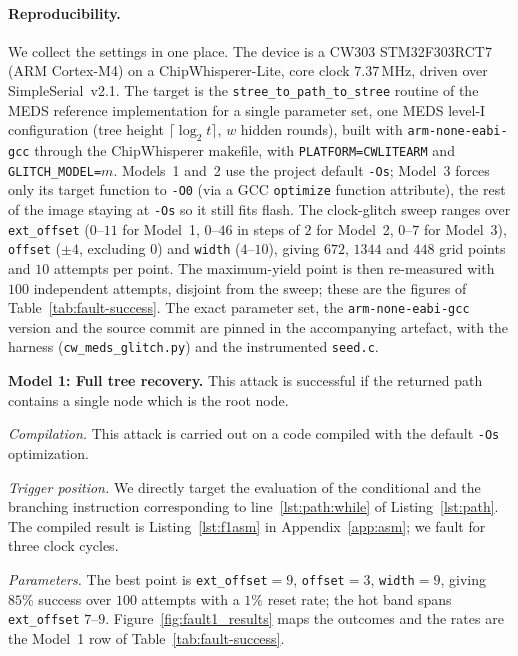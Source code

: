\paragraph{Reproducibility.} We collect the settings in one place. The
device is a CW303 STM32F303RCT7 (ARM Cortex-M4) on a ChipWhisperer-Lite, core
clock $7.37$\,MHz, driven over SimpleSerial~v2.1. The target is the
\texttt{stree\_to\_path\_to\_stree} routine of the MEDS reference
implementation for a single parameter set, one MEDS level-I configuration (tree height
$\lceil\log_2 t\rceil$, $w$ hidden rounds), built with \texttt{arm-none-eabi-gcc}
through the ChipWhisperer makefile, with \texttt{PLATFORM=CWLITEARM} and
\texttt{GLITCH\_MODEL=}$m$. Models~1 and~2 use the project default
\texttt{-Os}; Model~3
forces only its target function to \texttt{-O0}
(via a GCC \texttt{optimize} function attribute), the rest of the image staying
at \texttt{-Os} so it still fits flash. The clock-glitch sweep ranges over
\texttt{ext\_offset} ($0$--$11$ for Model~1, $0$--$46$ in steps of $2$ for
Model~2, $0$--$7$ for Model~3), \texttt{offset} ($\pm4$, excluding $0$) and
\texttt{width} ($4$--$10$), giving $672$, $1344$ and $448$ grid points and $10$
attempts per point. The maximum-yield point is then re-measured with $100$
independent attempts, disjoint from the sweep; these are the figures of
Table~\ref{tab:fault-success}. The exact parameter set, the
\texttt{arm-none-eabi-gcc} version and the source commit are pinned in the
accompanying artefact, with the harness (\texttt{cw\_meds\_glitch.py}) and the
instrumented \texttt{seed.c}.

\textbf{Model 1: Full tree recovery.}
This attack is successful if the returned path contains a
single node which is the root node.

\textit{Compilation.} This attack is carried out on a
code compiled with the default \texttt{-Os} optimization.

\textit{Trigger position.} We directly target the
evaluation of the conditional and the branching
instruction corresponding to line~\ref{lst:path:while} of Listing~\ref{lst:path}.
The compiled result is Listing~\ref{lst:f1asm} in
Appendix~\ref{app:asm}; we fault for three clock cycles.

\textit{Parameters.} The best point is \texttt{ext\_offset}$=9$,
\texttt{offset}$=3$, \texttt{width}$=9$, giving $85\%$ success over $100$
attempts with a $1\%$ reset rate; the hot band spans \texttt{ext\_offset}
$7$--$9$. Figure~\ref{fig:fault1_results} maps the outcomes and the rates are
the Model~1 row of Table~\ref{tab:fault-success}.

